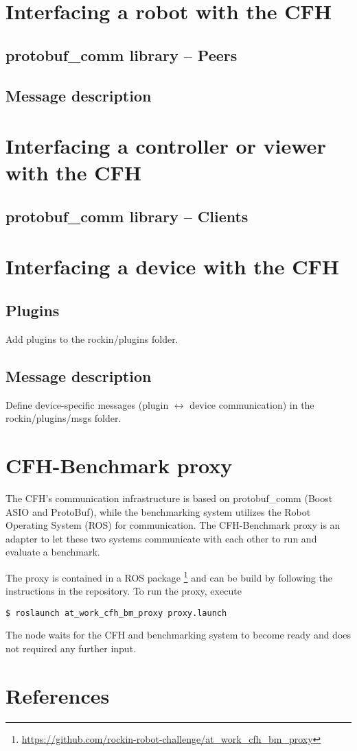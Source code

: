 \documentclass{article}
\begin{document}
\section{Interfacing a robot with the CFH}

\subsection{protobuf\_comm library -- Peers}

\subsection{Message description}

\section{Interfacing a controller or viewer with the CFH}

\subsection{protobuf\_comm library -- Clients}

\section{Interfacing a device with the CFH}

\subsection{Plugins}
Add plugins to the rockin/plugins folder.

\subsection{Message description}
Define device-specific messages (plugin $\leftrightarrow$ device communication) in the rockin/plugins/msgs folder.

\section{CFH-Benchmark proxy}
The CFH's communication infrastructure is based on protobuf\_comm (Boost ASIO and ProtoBuf), while the benchmarking
system utilizes the Robot Operating System (ROS) for communication. The CFH-Benchmark proxy is an adapter to let these
two systems communicate with each other to run and evaluate a benchmark.

The proxy is contained in a ROS package \footnote{\url{https://github.com/rockin-robot-challenge/at_work_cfh_bm_proxy}}
and can be build by following the instructions in the repository. To run the proxy, execute
\begin{lstlisting}
$ roslaunch at_work_cfh_bm_proxy proxy.launch
\end{lstlisting}
The node waits for the CFH and benchmarking system to become ready and does not required any further input.

\section{References}
\end{document}

